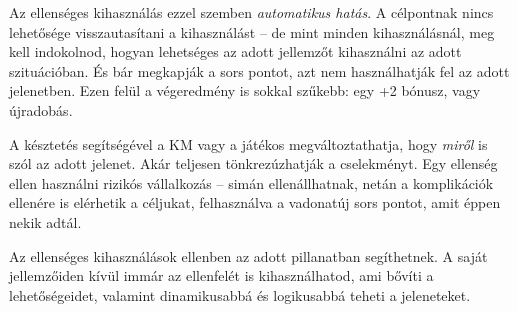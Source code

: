 Az ellenséges kihasználás ezzel szemben \emph{automatikus hatás}. A célpontnak nincs lehetősége visszautasítani a kihasználást – de mint minden kihasználásnál, meg kell indokolnod, hogyan lehetséges az adott jellemzőt kihasználni az adott szituációban. És bár megkapják a sors pontot, azt nem használhatják fel az adott jelenetben. Ezen felül a végeredmény is sokkal szűkebb: egy +2 bónusz, vagy újradobás.

A késztetés segítségével a KM vagy a játékos megváltoztathatja, hogy \emph{miről} is szól az adott jelenet. Akár teljesen tönkrezúzhatják a cselekményt. Egy ellenség ellen használni rizikós vállalkozás – simán ellenállhatnak, netán a komplikációk ellenére is elérhetik a céljukat, felhasználva a vadonatúj sors pontot, amit éppen nekik adtál.

Az ellenséges kihasználások ellenben az adott pillanatban segíthetnek. A saját jellemzőiden kívül immár az ellenfelét is kihasználhatod, ami bővíti a lehetőségeidet, valamint dinamikusabbá és logikusabbá teheti a jeleneteket.
